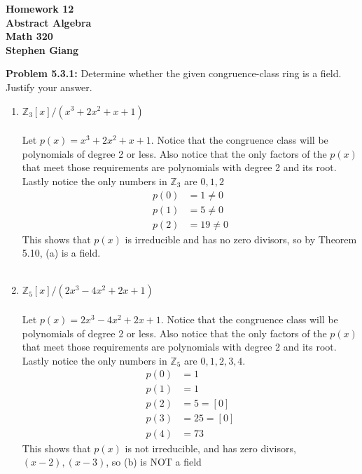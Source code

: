 \documentclass[12pt]{article}
\begin{document}
	
	\begin{center}
		\textbf{Homework 12} \\
		\textbf{Abstract Algebra} \\
		\textbf{Math 320} \\
		\textbf{Stephen Giang} \\
	\end{center}

\noindent \textbf{Problem 5.3.1: }Determine whether the given congruence-class ring is a field. Justify your answer. \\  
	\begin{enumerate}[label = (\alph*)]
		\item $\mathbb{Z}_3[x]/ (x^3 + 2x^2 + x + 1)$
		\\ \\
		Let $p(x) = x^3 + 2x^2 + x + 1$. Notice that the congruence class will be polynomials of degree 2 or less.  Also notice that the only factors of the $p(x)$ that meet those requirements are polynomials with degree 2 and its root.  Lastly notice the only numbers in $\mathbb{Z}_3$ are $0,1,2$
			\begin{align*}
				p(0) &= 1 \not = 0 \\
				p(1) &= 5 \not = 0 \\
				p(2) &= 19 \not = 0
			\end{align*} 
		This shows that $p(x)$ is irreducible and has no zero divisors, so by Theorem 5.10, (a) is a field. 
		\\ \\
		\item $\mathbb{Z}_5[x]/ (2x^3 - 4x^2 + 2x + 1)$
		\\ \\
		Let $p(x) = 2x^3 - 4x^2 + 2x + 1$. Notice that the congruence class will be polynomials of degree 2 or less.  Also notice that the only factors of the $p(x)$ that meet those requirements are polynomials with degree 2 and its root.  Lastly notice the only numbers in $\mathbb{Z}_5$ are $0,1,2,3,4$.
			\begin{align*}
				p(0) &= 1\\
				p(1) &= 1\\
				p(2) &= 5 = [0]\\
				p(3) &= 25 = [0]\\
				p(4) &= 73
			\end{align*}
		This shows that $p(x)$ is not irreducible, and has zero divisors, $(x-2),(x-3)$, so (b) is NOT a field
		
		\newpage 
		

\end{enumerate}
\end{document}
